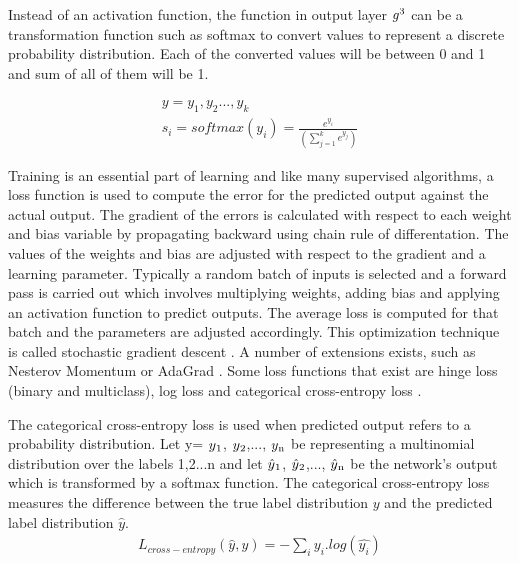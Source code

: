 \documentclass[a4paper, 11pt]{article}
\begin{document}
Instead of an activation function, the function in output layer $g\textsuperscript{3}$ can be a transformation function such as softmax to convert values to represent a discrete probability distribution. Each of the converted values will be between 0 and 1 and sum of all of them will be 1.

\begin{align*}
y = y_1,y_2...,y_k \\
s_i = softmax(y_i) = \frac{e^{y_i}}{(\sum_{j=1}^ke^{y_j})}
\end{align*}

Training is an essential part of learning and like many supervised algorithms, a loss function is used to compute the error for the predicted output against the actual output. The gradient of the errors is calculated with respect to each weight and bias variable by propagating backward using chain rule of differentation. The values of the weights and bias are adjusted with respect to the gradient and a learning parameter. Typically a random batch of inputs is selected and a forward pass is carried out which involves multiplying weights, adding bias and applying an activation function to predict outputs. The average loss is computed for that batch and the parameters are adjusted accordingly. This optimization technique is called stochastic gradient descent \cite{Bottou2012}. A number of extensions exists, such as Nesterov Momentum \cite{Sutskever2013} or AdaGrad \cite{Duchi2011}. Some loss functions that exist are hinge loss (binary and multiclass), log loss and categorical cross-entropy loss \cite{Goldberg2016}. 


The categorical cross-entropy loss is used when predicted output refers to a probability distribution. Let y= $y\textsubscript{1}$, $y\textsubscript{2}$,..., $y\textsubscript{n}$ be representing a multinomial distribution over the labels 1,2...n and let $\hat{y}\textsubscript{1}$, $\hat{y}\textsubscript{2}$,..., $\hat{y}\textsubscript{n}$ be the network's output which is transformed by a softmax function. The categorical cross-entropy loss measures the difference between the true label distribution $y$ and the predicted label distribution $\hat{y}$. 
\begin{align*}
L_{cross-entropy}(\hat{y},y) = -\sum_iy_i.log(\hat{y_i})
\end{align*}
\end{document}
